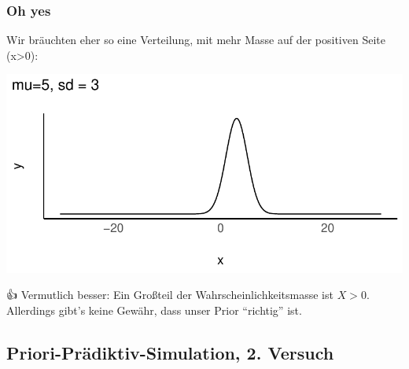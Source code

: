 \documentclass[
  a4paper,
  DIV=11]{scrreprt}
\theoremstyle{definition}
\theoremstyle{remark}
\begin{document}
\hypertarget{oh-yes}{%
\subsubsection{Oh yes}\label{oh-yes}}

Wir bräuchten eher so eine Verteilung, mit mehr Masse auf der positiven
Seite (x\textgreater0):

\includegraphics{./lineare-modelle_files/figure-pdf/Post-Regression-17-1.pdf}

👍 Vermutlich besser: Ein Großteil der Wahrscheinlichkeitsmasse ist
\(X>0\). Allerdings gibt's keine Gewähr, dass unser Prior ``richtig''
ist.

\hypertarget{priori-pruxe4diktiv-simulation-2.-versuch}{%
\subsection{Priori-Prädiktiv-Simulation, 2.
Versuch}\label{priori-pruxe4diktiv-simulation-2.-versuch}}
\end{document}
